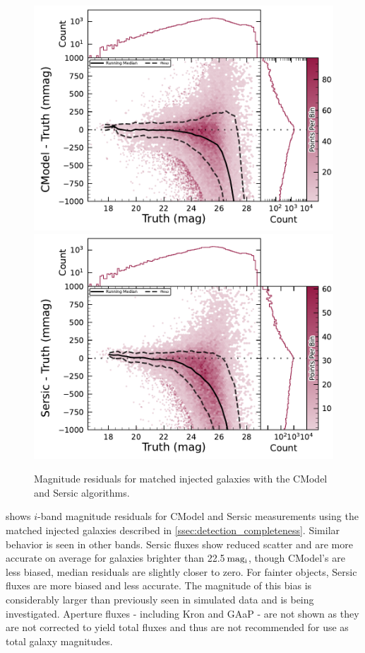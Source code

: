 \begin{figure}[htb]
\centering
\includegraphics[width=0.98\linewidth]{figures/injected_lsst_cells_v1_5063_i_mag_cmodel.pdf}
\includegraphics[width=0.98\linewidth]{figures/injected_lsst_cells_v1_5063_i_mag_sersic.pdf}
\caption{Magnitude residuals for matched injected galaxies with the CModel and Sersic algorithms.}
\label{fig:injected_lsst_cells_v1_5063_i_mag}
\vspace{0.1cm}
\end{figure}

 shows $i$-band magnitude residuals for CModel and Sersic measurements using the matched injected galaxies described in \ref{ssec:detection_completeness}.
Similar behavior is seen in other bands.
Sersic fluxes show reduced scatter and are more accurate on average for galaxies brighter than 22.5\,${\rm mag_{i}}$, though CModel's are less biased, median residuals are slightly closer to zero.
For fainter objects, Sersic fluxes are more biased and less accurate.
The magnitude of this bias is considerably larger than previously seen in simulated data and is being investigated.
Aperture fluxes - including Kron and \gls{GAaP} - are not shown as they are not corrected to yield total fluxes and thus are not recommended for use as total galaxy magnitudes.

